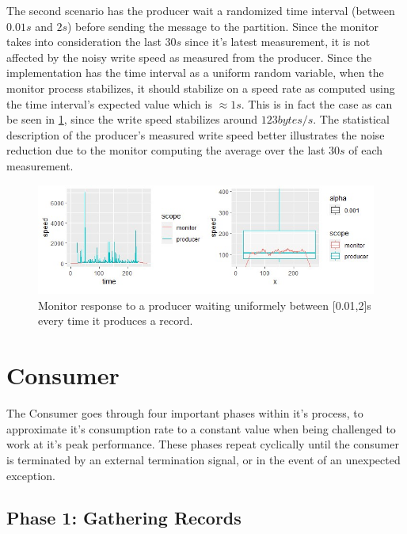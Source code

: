 The second scenario has the producer wait a randomized time interval (between
$0.01s$ and $2s$) before sending the message to the partition. Since the monitor
takes into consideration the last $30s$ since it's latest measurement, it is not
affected by the noisy write speed as measured from the producer. Since the
implementation has the time interval as a uniform random variable, when the
monitor process stabilizes, it should stabilize on a speed rate as computed
using the time interval's expected value which is $\approx 1s$. This is in fact
the case as can be seen in \ref{fig:monitor_random}, since the write speed
stabilizes around $123 bytes/s$. The statistical description of the producer's
measured write speed better illustrates the noise reduction due to the monitor
computing the average over the last $30s$ of each measurement.

\begin{figure}[H] 
    \centering
    \includegraphics[width=\textwidth]{images/monitor/monitor_random.jpg}
    \caption{
        Monitor response to a producer waiting uniformely between [0.01,2]s
        every time it produces a record.
    } 
    \label{fig:monitor_random} 
\end{figure}


\section{Consumer} \label{component:consumer}

The Consumer goes through four important phases within it's process, to
approximate it's consumption rate to a constant value when being challenged to
work at it's peak performance. These phases repeat cyclically until the consumer
is terminated by an external termination signal, or in the event of an
unexpected exception. 

\subsection{Phase 1: Gathering Records}

